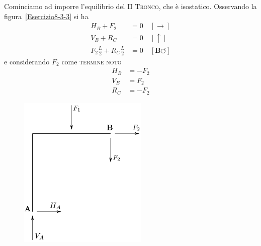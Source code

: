 Cominciamo ad imporre l'equilibrio del \textsc{II Tronco}, che è isostatico. Osservando la figura~\ref{Esercizio8-3-3} si ha
\begin{align*}
H_B + F_2 &= 0 \quad [\rightarrow] \\
V_B + R_C &= 0 \quad [\uparrow] \\ 
F_{2}\frac{L}{2} + R_{C}\frac{L}{2} &= 0 \quad [\mathbf{B}\circlearrowleft] 
\end{align*}
e considerando $F_2$ come \textsc{termine noto}
\begin{align*}
H_B &= -F_2  \\
V_B &=  F_2  \\ 
R_C &= -F_2 
\end{align*}
\renewcommand{\thefigure}{8.3~-~3}
\begin{figure}[ht]
\centering
\includegraphics[width=0.55\textwidth]{Immagini/Parte_8/Esercizio8_3/Esercizio8_3_4.pdf}
\caption{}
\label{Esercizio8-3-4}
\end{figure}
